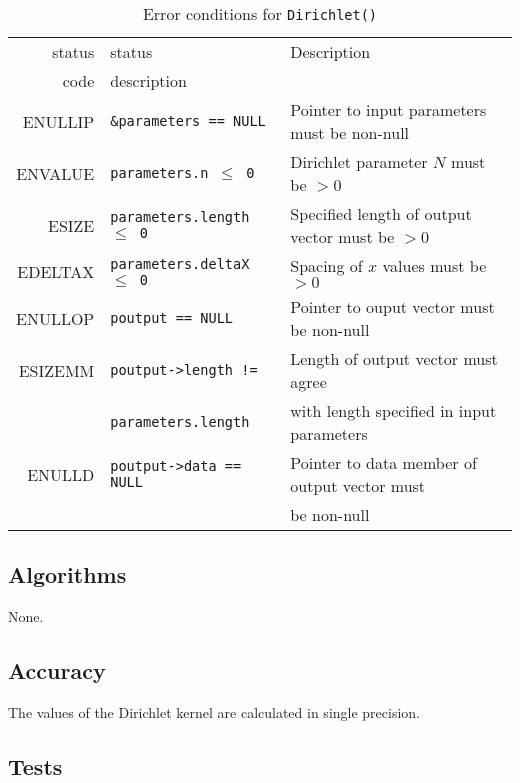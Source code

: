 \documentclass{article}
\begin{document}
\begin{table}
\begin{center}
\begin{tabular}{|r|l|l|}\hline
status & status & Description\\
code   & description &\\
\hline
ENULLIP	& {\tt \&parameters == NULL\/} 
& Pointer to input parameters must be non-null\\
ENVALUE & {\tt parameters.n $\le$ 0} 
& Dirichlet parameter $N$ must be $>0$\\
ESIZE & {\tt parameters.length $\le$ 0} 
& Specified length of output vector must be $>0$\\
EDELTAX & {\tt parameters.deltaX $\le$ 0} 
& Spacing of $x$ values must be $>0$\\
ENULLOP & {\tt poutput == NULL\/}
& Pointer to ouput vector must be non-null\\
ESIZEMM & {\tt poutput->length !=\/}
& Length of output vector must agree\\
& {\tt parameters.length\/} 
& with length specified in input parameters\\
ENULLD & {\tt poutput->data == NULL\/}
& Pointer to data member of output vector must\\
&& be non-null\\
\hline
\end{tabular}
\end{center}
%
\caption{Error conditions for {\tt Dirichlet()\/}}
\label{tbl:Errors}
\end{table}
                                
\subsection{Algorithms}


None.

\subsection{Accuracy}


The values of the Dirichlet kernel are calculated in single precision.

\subsection{Tests}
\end{document}
